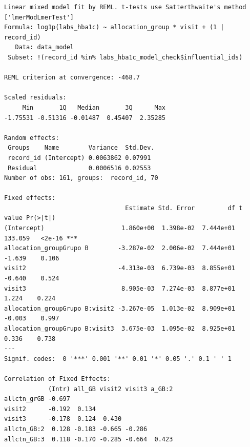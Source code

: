 \documentclass[
  12pt,
]{article}
\newenvironment{Shaded}{\begin{snugshade}}{\end{snugshade}}
\newcommand{\NormalTok}[1]{\textcolor[rgb]{0.00,0.23,0.31}{#1}}
\newcommand{\SpecialCharTok}[1]{\textcolor[rgb]{0.37,0.37,0.37}{#1}}
\begin{document}
\begin{verbatim}
Linear mixed model fit by REML. t-tests use Satterthwaite's method ['lmerModLmerTest']
Formula: log1p(labs_hba1c) ~ allocation_group * visit + (1 | record_id)
   Data: data_model
 Subset: !(record_id %in% labs_hba1c_model_check$influential_ids)

REML criterion at convergence: -468.7

Scaled residuals: 
     Min       1Q   Median       3Q      Max 
-1.75531 -0.51316 -0.01487  0.45407  2.35285 

Random effects:
 Groups    Name        Variance  Std.Dev.
 record_id (Intercept) 0.0063862 0.07991 
 Residual              0.0006516 0.02553 
Number of obs: 161, groups:  record_id, 70

Fixed effects:
                                 Estimate Std. Error         df t value Pr(>|t|)    
(Intercept)                     1.860e+00  1.398e-02  7.444e+01 133.059   <2e-16 ***
allocation_groupGrupo B        -3.287e-02  2.006e-02  7.444e+01  -1.639    0.106    
visit2                         -4.313e-03  6.739e-03  8.855e+01  -0.640    0.524    
visit3                          8.905e-03  7.274e-03  8.877e+01   1.224    0.224    
allocation_groupGrupo B:visit2 -3.267e-05  1.013e-02  8.909e+01  -0.003    0.997    
allocation_groupGrupo B:visit3  3.675e-03  1.095e-02  8.925e+01   0.336    0.738    
---
Signif. codes:  0 '***' 0.001 '**' 0.01 '*' 0.05 '.' 0.1 ' ' 1

Correlation of Fixed Effects:
            (Intr) all_GB visit2 visit3 a_GB:2
allctn_grGB -0.697                            
visit2      -0.192  0.134                     
visit3      -0.178  0.124  0.430              
allctn_GB:2  0.128 -0.183 -0.665 -0.286       
allctn_GB:3  0.118 -0.170 -0.285 -0.664  0.423
\end{verbatim}

\begin{Shaded}
\end{Shaded}
\end{document}
